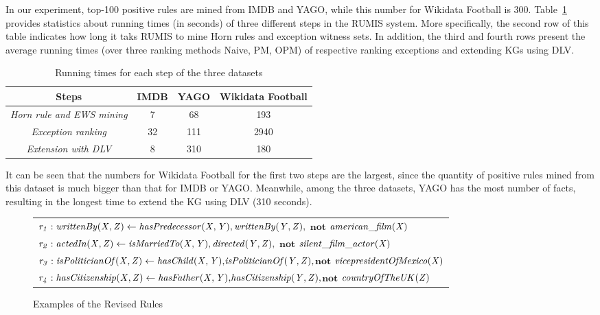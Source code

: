 In our experiment, top-100 positive rules are mined from IMDB and YAGO, while this number for Wikidata Football is 300. Table~\ref{tab:run_time} provides statistics about running times (in seconds) of three different steps in the RUMIS system. More specifically, the second row of this table indicates how long it taks RUMIS to mine Horn rules and exception witness sets. In addition, the third and fourth rows present the average running times (over three ranking methods Naive, PM, OPM) of respective ranking exceptions and extending KGs using DLV.

\begin{table}[ht]
\centering
\footnotesize{
\begin{tabular}{|c|ccc|}
\hline
\textbf{Steps} & \textbf{IMDB} & \textbf{YAGO} & \textbf{Wikidata Football}\\
\hline
 \textit{Horn rule and EWS mining} & 7 & 68 & 193\\
 \textit{Exception ranking} & 32 & 111 & 2940\\
 \textit{Extension with DLV} & 8 & 310 & 180\\
 \hline 
\end{tabular}
}
\smallskip
\caption{Running times for each step of the three datasets}
\label{tab:run_time}
\end{table}

It can be seen that the numbers for Wikidata Football for the first two steps are the largest, since the quantity of positive rules mined from this dataset is much bigger than that for IMDB or YAGO. Meanwhile, among the three datasets, YAGO has the most number of facts, resulting in the longest time to extend the KG using DLV (310 seconds).

\begin{figure}[t]
    \centering
   
    \vspace{-.2cm}
    \begin{tabular}{l}
 {\scriptsize
        $\mathit{r_1: writtenBy(X, Z)}  \leftarrow
        \mathit{hasPredecessor(X, Y)},\mathit{writtenBy(Y, Z)},$ $ \textbf{not}$  $\mathit{american\_film(X)} $}\\        
       {\scriptsize 
$\mathit{r_2:  actedIn(X, Z)}  \leftarrow
        \mathit{isMarriedTo(X, Y)},\mathit{directed(Y, Z)},$ $ \textbf{not}$  $\mathit{silent\_film\_actor(X)} $} \\
          {\scriptsize 
$\mathit{r_3:  isPoliticianOf(X, Z)}  \leftarrow
        \mathit{hasChild(X, Y)}{,}\mathit{isPoliticianOf(Y, Z)}{,}$$ \textbf{not}$  $\mathit{vicepresidentOfMexico(X)} $} \\
          {\scriptsize 
$\mathit{r_4:  hasCitizenship(X, Z)}  \leftarrow
        \mathit{hasFather(X, Y)}{,}\mathit{hasCitizenship(Y, Z)}{,}$$ \textbf{not}$  $\mathit{countryOfTheUK(Z)} $} \\
 \end{tabular}            
    \caption{Examples of the Revised Rules}
 \label{fig:examplerules}
 \vspace{-.4cm}
\end{figure}

